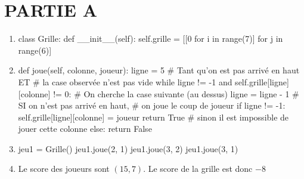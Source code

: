 
\pagestyle{DS_FP}

\bigskip


\emph{\quad}

\section*{PARTIE A}


\begin{enumerate}
    \item \quad
    
    \begin{CodePythontexAlt}[TaillePolice=\large, Largeur=1\linewidth,Centre,Lignes=true,PremLigne=1]{}
class Grille:
    def __init__(self):
        self.grille = [[0 for i in range(7)] for j in range(6)]

    \end{CodePythontexAlt}

    \medskip

    \item \quad 
    
    \begin{CodePythontexAlt}[TaillePolice=\large, Largeur=1\linewidth,Centre,Lignes=true,PremLigne=1]{}
    def joue(self, colonne, joueur):
        ligne = 5
        # Tant qu'on est pas arrivé en haut ET
        # la case observée n'est pas vide
        while ligne != -1 and self.grille[ligne][colonne] != 0:
            # On cherche la case suivante (au dessus)
            ligne = ligne - 1
        # SI on n'est pas arrivé en haut, 
        # on joue le coup de joueur
        if ligne != -1:
            self.grille[ligne][colonne] = joueur
            return True
        # sinon il est impossible de jouer cette colonne
        else:
            return False
    \end{CodePythontexAlt}

    \medskip
    \item \quad
    
    \begin{CodePythontexAlt}[TaillePolice=\large, Largeur=1\linewidth,Centre,Lignes=true,PremLigne=1]{}
jeu1 = Grille()
jeu1.joue(2, 1)
jeu1.joue(3, 2)
jeu1.joue(3, 1)
    \end{CodePythontexAlt}

        \medskip
    \item Le score des joueurs sont $(15, 7)$. Le score de la grille est donc $-8$
    

\end{enumerate}
